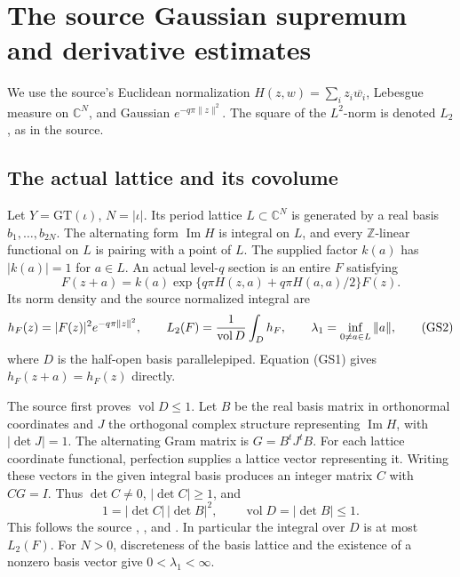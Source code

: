 \section{The source Gaussian supremum and derivative estimates}
\label{sec:sr-source-gaussian-sup}
We use the source's Euclidean normalization
\(H(z,w)=\sum_i z_i\overline{w_i}\), Lebesgue measure on
\(\mathbb C^N\), and Gaussian \(e^{-q\pi\|z\|^2}\).
The square of the \(L^2\)-norm is denoted \(L_2\), as in the source.

\subsection{The actual lattice and its covolume}
Let \(Y=\mathrm{GT}(\iota)\), \(N=|\iota|\).
Its period lattice \(L\subset\mathbb C^N\) is generated by a
real basis \(b_1,\ldots,b_{2N}\).
The alternating form \(\operatorname{Im}H\) is integral on \(L\),
and every \(\mathbb Z\)-linear functional on \(L\) is pairing
with a point of \(L\). The supplied factor \(k(a)\) has
\(|k(a)|=1\) for \(a\in L\).
An actual level-\(q\) section is an entire \(F\) satisfying
\[
 F(z+a)=k(a)\exp\{q\pi H(z,a)+q\pi H(a,a)/2\}F(z).
 \tag{GS1}\label{eq:sr-source-GT-section}
\]
Its norm density and the source normalized integral are
\[
 h_F(z)=|F(z)|^2e^{-q\pi\|z\|^2},\qquad
 L_2(F)={1\over\operatorname{vol}D}\int_Dh_F,\qquad
 \lambda_1=\inf_{0\ne a\in L}\|a\|,
 \tag{GS2}\label{eq:sr-source-GT-norm}
\]
where \(D\) is the half-open basis parallelepiped.
Equation (GS1) gives \(h_F(z+a)=h_F(z)\) directly.

The source first proves \(\operatorname{vol}D\le1\).
Let \(B\) be the real basis matrix in orthonormal coordinates
and \(J\) the orthogonal complex structure representing
\(\operatorname{Im}H\), with \(|\det J|=1\).
The alternating Gram matrix is \(G=B^tJ^tB\).
For each lattice coordinate functional, perfection supplies a
lattice vector representing it.
Writing these vectors in the given integral basis produces
an integer matrix \(C\) with \(CG=I\).
Thus \(\det C\ne0\), \(|\det C|\ge1\), and
\[
                  1=|\det C|\,|\det B|^2,\qquad
                           \operatorname{vol}D=|\det B|\le1 .
 \tag{GS3}\label{eq:sr-source-GT-volume}
\]
This follows the source
, ,
and .
In particular the integral over \(D\) is at most \(L_2(F)\).
For \(N>0\), discreteness of the basis lattice and the existence
of a nonzero basis vector give \(0<\lambda_1<\infty\).

